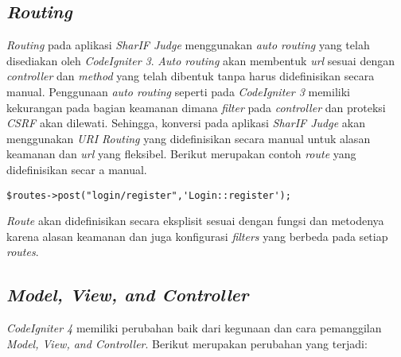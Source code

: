 \subsection{\textit{Routing}}
\textit{Routing} pada aplikasi \textit{SharIF Judge} menggunakan \textit{auto routing} yang telah disediakan oleh \textit{CodeIgniter 3}. \textit{Auto routing} akan membentuk \textit{url} sesuai dengan \textit{controller} dan \textit{method} yang telah dibentuk tanpa harus didefinisikan secara manual. Penggunaan \textit{auto routing} seperti pada \textit{CodeIgniter 3} memiliki kekurangan pada bagian keamanan dimana \textit{filter} pada \textit{controller} dan proteksi \textit{CSRF} akan dilewati. Sehingga, konversi pada aplikasi \textit{SharIF Judge} akan menggunakan \textit{URI Routing} yang didefinisikan secara manual untuk alasan keamanan dan \textit{url} yang fleksibel. Berikut merupakan contoh \textit{route} yang didefinisikan secar a manual.
\begin{center}
\verb|$routes->post("login/register",'Login::register');|
\end{center}
\textit{Route} akan didefinisikan secara eksplisit sesuai dengan fungsi dan metodenya karena alasan keamanan dan juga konfigurasi \textit{filters} yang berbeda pada setiap \textit{routes}.

\subsection{\textit{Model, View, and Controller}}
\textit{CodeIgniter 4} memiliki perubahan baik dari kegunaan dan cara pemanggilan \textit{Model, View, and Controller}. Berikut merupakan perubahan yang terjadi:
